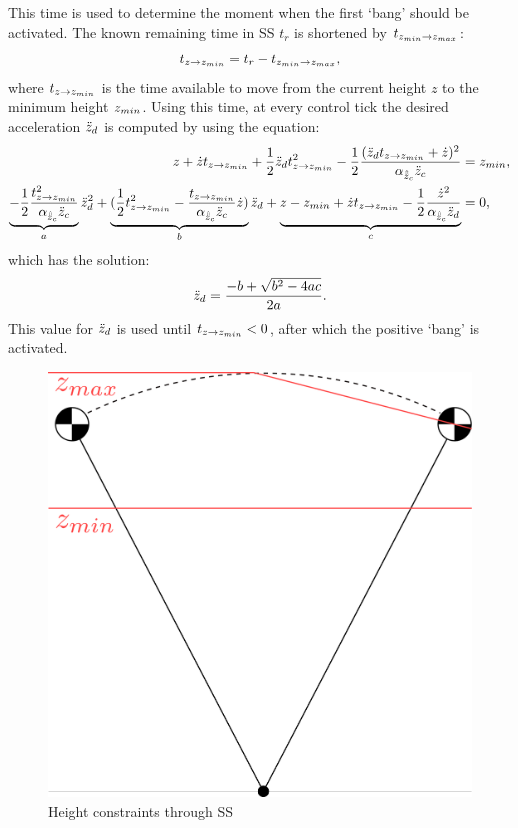 This time is used to determine the moment when the first `bang' should be activated. The known remaining time in \ac{SS} $t_{r}$ is shortened by $ t_{z_{min} \rightarrow z_{max}}$:
\begin{equation}
	t_{z \rightarrow z_{min}} =t_{r} - t_{z_{min} \rightarrow z_{max}},
\end{equation}
where $t_{z \rightarrow z_{min}} $ is the time available to move from the current height $z$ to the minimum height $z_{min}$. Using this time, at every control tick the desired acceleration $\ddot{z}_d$ is computed by using the equation:
\begin{align}
	z + \dot{z}t_{z \rightarrow z_{min}} + \frac{1}{2}\ddot{z}_d t_{z \rightarrow z_{min}}^2 - \frac{1}{2}\frac{(\ddot{z}_d t_{z \rightarrow z_{min}} + \dot{z})^2}{\alpha_{\hat{\ddot{z}}_{c}} \ddot{z}_{c}} &= z_{min}, \\
	\underbrace{-\frac{1}{2}\frac{t_{z \rightarrow z_{min}}^2}{\alpha_{\hat{\ddot{z}}_{c}} \ddot{z}_{c}}}_a \ddot{z}_d^2 + \underbrace{(\frac{1}{2}t_{z \rightarrow z_{min}}^2-\frac{t_{z \rightarrow z_{min}}}{\alpha_{\hat{\ddot{z}}_{c}} \ddot{z}_{c}} \dot{z})}_b \ddot{z}_d + \underbrace{z -z_{min} +\dot{z}t_{z \rightarrow z_{min}} -\frac{1}{2}\frac{\dot{z}^2}{\alpha_{\hat{\ddot{z}}_{c}} \ddot{z}_d}}_c&=0,
\end{align}
which has the solution:
\begin{equation}
 	\ddot{z}_d = \frac{-b + \sqrt{b^2-4ac}}{2a}.
\end{equation}
This value for $\ddot{z}_d$ is used until $t_{z \rightarrow z_{min}}<0$, after which the positive `bang' is activated. 
\begin{figure}[h]
\centering
  \includegraphics[width=.4\linewidth]{STYLESTUFF/heightconstraints.png}
   \caption{Height constraints through \acf{SS}}
    \label{fig:heightconstraints}
\end{figure} 
